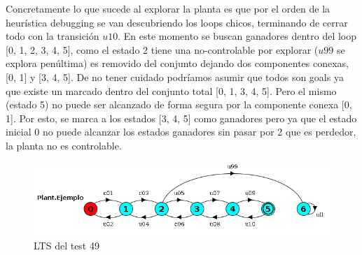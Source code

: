 Concretamente lo que sucede al explorar la planta es que por el orden de la heurística debugging se van descubriendo los loops chicos, terminando de cerrar todo con la transición $u10$. En este momento se buscan ganadores dentro del loop [0, 1, 2, 3, 4, 5], como el estado 2 tiene una no-controlable por explorar ($u99$ se explora penúltima) es removido del conjunto dejando dos componentes conexas, [0, 1] y [3, 4, 5]. De no tener cuidado podríamos asumir que todos son goals ya que existe un marcado dentro del conjunto total [0, 1, 3, 4, 5]. Pero el mismo (estado 5) no puede ser alcanzado de forma segura por la componente conexa [0, 1]. Por esto, se marca a los estados [3, 4, 5] como ganadores pero ya que el estado inicial 0 no puede alcanzar los estados ganadores sin pasar por 2 que es perdedor, la planta no es controlable.
\begin{figure}[h]
 \centering
 \includegraphics[scale=0.7]{figures/tests/test49.png}
 \caption{LTS del test 49}
 \label{fig:test49}
\end{figure}
